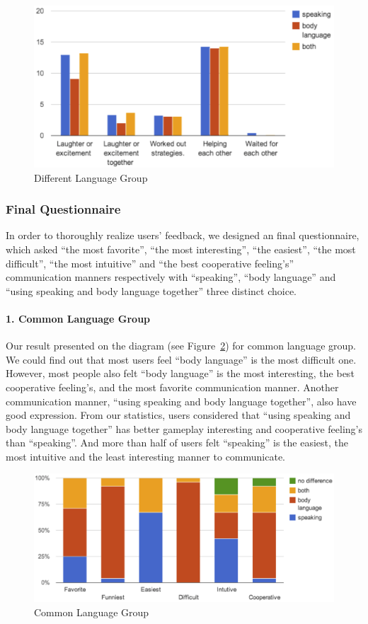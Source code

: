 \begin{figure}[!h]
\centering
\includegraphics[width=0.9\columnwidth]{Figures/US_CPMs_Dif.png}
\caption{Different Language Group}
\label{fig:US_CPMs_Dif}
\end{figure}


\subsubsection{Final Questionnaire}
In order to thoroughly realize users' feedback, we designed an final questionnaire, which asked ``the most favorite'', ``the most interesting'', ``the easiest'', ``the most difficult'', ``the most intuitive'' and ``the best cooperative feeling's'' communication manners respectively with ``speaking'', ``body language'' and ``using speaking and body language together'' three distinct choice.

\paragraph{1. Common Language Group}
Our result presented on the diagram (see Figure~\ref{fig:US_FQ_Com}) for common language group. We could find out that most users feel ``body language'' is the most difficult one. However, most people also felt ``body language'' is the most interesting, the best cooperative feeling's, and the most favorite communication manner. Another communication manner, ``using speaking and body language together'', also have good expression. From our statistics, users considered that ``using speaking and body language together'' has better gameplay interesting and cooperative feeling's than ``speaking''. And more than half of users felt ``speaking'' is the easiest, the most intuitive and the least interesting manner to communicate.

\begin{figure}[!h]
\centering
\includegraphics[width=0.9\columnwidth]{Figures/US_FQ_Com.png}
\caption{Common Language Group}
\label{fig:US_FQ_Com}
\end{figure}

